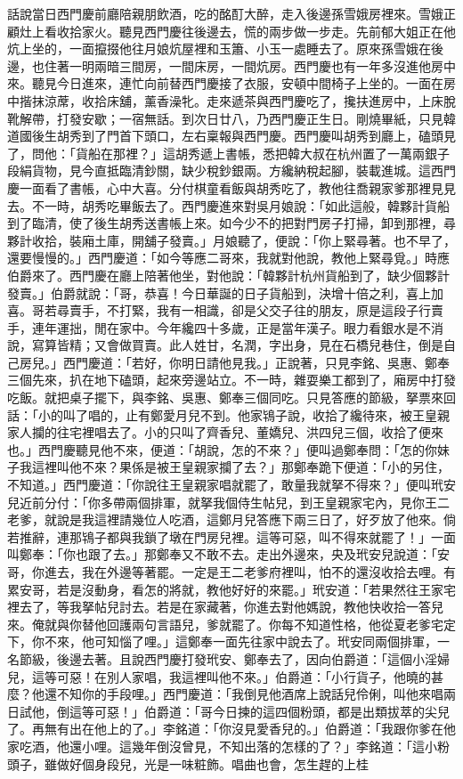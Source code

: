 \begin{showcontents}{}
話說當日西門慶前廳陪親朋飲酒，吃的酩酊大醉，走入後邊孫雪娥房裡來。雪娥正顧灶上看收拾家火。聽見西門慶往後邊去，慌的兩步做一步走。先前郁大姐正在他炕上坐的，一面攛掇他往月娘炕屋裡和玉簫、小玉一處睡去了。原來孫雪娥在後邊，也住著一明兩暗三間房，一間床房，一間炕房。西門慶也有一年多沒進他房中來。聽見今日進來，連忙向前替西門慶接了衣服，安頓中間椅子上坐的。一面在房中揩抹涼蓆，收拾床舖，薰香澡牝。走來遞茶與西門慶吃了，攙扶進房中，上床脫靴解帶，打發安歇；一宿無話。到次日廿八，乃西門慶正生日。剛燒畢紙，只見韓道國後生胡秀到了門首下頭口，左右稟報與西門慶。西門慶叫胡秀到廳上，磕頭見了，問他：「貨船在那裡？」這胡秀遞上書帳，悉把韓大叔在杭州置了一萬兩銀子段絹貨物，見今直抵臨清鈔關，缺少稅鈔銀兩。方纔納稅起腳，裝載進城。這西門慶一面看了書帳，心中大喜。分付棋童看飯與胡秀吃了，教他往喬親家爹那裡見見去。不一時，胡秀吃畢飯去了。西門慶進來對吳月娘說：「如此這般，韓夥計貨船到了臨清，使了後生胡秀送書帳上來。如今少不的把對門房子打掃，卸到那裡，尋夥計收拾，裝廂土庫，開舖子發賣。」月娘聽了，便說：「你上緊尋著。也不早了，還要慢慢的。」西門慶道：「如今等應二哥來，我就對他說，教他上緊尋覓。」時應伯爵來了。西門慶在廳上陪著他坐，對他說：「韓夥計杭州貨船到了，缺少個夥計發賣。」伯爵就說：「哥，恭喜！今日華誕的日子貨船到，決增十倍之利，喜上加喜。哥若尋賣手，不打緊，我有一相識，卻是父交子往的朋友，原是這段子行賣手，連年運拙，閒在家中。今年纔四十多歲，正是當年漢子。眼力看銀水是不消說，寫算皆精；又會做買賣。此人姓甘，名潤，字出身，見在石橋兒巷住，倒是自己房兒。」西門慶道：「若好，你明日請他見我。」正說著，只見李銘、吳惠、鄭奉三個先來，扒在地下磕頭，起來旁邊站立。不一時，雜耍樂工都到了，廂房中打發吃飯。就把桌子擺下，與李銘、吳惠、鄭奉三個同吃。只見答應的節級，拏票來回話：「小的叫了唱的，止有鄭愛月兒不到。他家鴇子說，收拾了纔待來，被王皇親家人攔的往宅裡唱去了。小的只叫了齊香兒、董嬌兒、洪四兒三個，收拾了便來也。」西門慶聽見他不來，便道：「胡說，怎的不來？」便叫過鄭奉問：「怎的你妹子我這裡叫他不來？果係是被王皇親家攔了去？」那鄭奉跪下便道：「小的另住，不知道。」西門慶道：「你說往王皇親家唱就罷了，敢量我就拏不得來？」便叫玳安兒近前分付：「你多帶兩個排軍，就拏我個侍生帖兒，到王皇親家宅內，見你王二老爹，就說是我這裡請幾位人吃酒，這鄭月兒答應下兩三日了，好歹放了他來。倘若推辭，連那鴇子都與我鎖了墩在門房兒裡。這等可惡，叫不得來就罷了！」一面叫鄭奉：「你也跟了去。」那鄭奉又不敢不去。走出外邊來，央及玳安兒說道：「安哥，你進去，我在外邊等著罷。一定是王二老爹府裡叫，怕不的還沒收拾去哩。有累安哥，若是沒動身，看怎的將就，教他好好的來罷。」玳安道：「若果然往王家宅裡去了，等我拏帖兒討去。若是在家藏著，你進去對他媽說，教他快收拾一答兒來。俺就與你替他回護兩句言語兒，爹就罷了。你每不知道性格，他從夏老爹宅定下，你不來，他可知惱了哩。」這鄭奉一面先往家中說去了。玳安同兩個排軍，一名節級，後邊去著。且說西門慶打發玳安、鄭奉去了，因向伯爵道：「這個小淫婦兒，這等可惡！在別人家唱，我這裡叫他不來。」伯爵道：「小行貨子，他曉的甚麼？他還不知你的手段哩。」西門慶道：「我倒見他酒席上說話兒伶俐，叫他來唱兩日試他，倒這等可惡！」伯爵道：「哥今日揀的這四個粉頭，都是出類拔萃的尖兒了。再無有出在他上的了。」李銘道：「你沒見愛香兒的。」伯爵道：「我跟你爹在他家吃酒，他還小哩。這幾年倒沒曾見，不知出落的怎樣的了？」李銘道：「這小粉頭子，雖做好個身段兒，光是一味粧飾。唱曲也會，怎生趕的上桂
\end{showcontents}
